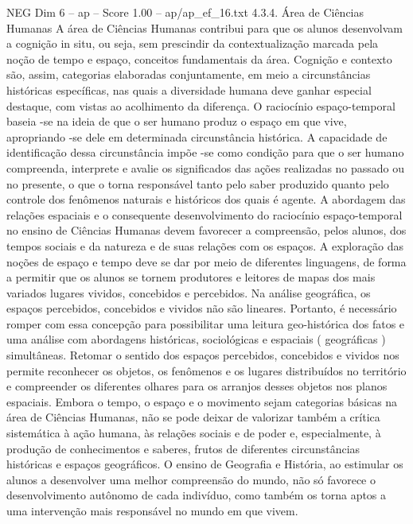 \begin{textsample}{NEG Dim 6 – ap – Score 1.00 – ap/ap\_ef\_16.txt}  \label{ex:f6_neg_185}
4.3.4.
Área de Ciências Humanas A área de Ciências Humanas contribui para que os alunos desenvolvam a cognição in situ, ou seja, sem prescindir da contextualização marcada pela noção de tempo e espaço, conceitos fundamentais da área.
Cognição e contexto são, assim, categorias elaboradas conjuntamente, em meio a circunstâncias históricas específicas, nas quais a diversidade humana deve ganhar especial destaque, com vistas ao acolhimento da diferença.
O raciocínio espaço-temporal baseia -se na ideia de que o ser humano produz o espaço em que vive, apropriando -se dele em determinada circunstância histórica.
A capacidade de identificação dessa circunstância impõe -se como condição para que o ser humano compreenda, interprete e avalie os significados das ações realizadas no passado ou no presente, o que o torna responsável tanto pelo saber produzido quanto pelo controle dos fenômenos naturais e históricos dos quais é agente.
A abordagem das relações espaciais e o consequente desenvolvimento do raciocínio espaço-temporal no ensino de Ciências Humanas devem favorecer a compreensão, pelos alunos, dos tempos sociais e da natureza e de suas relações com os espaços.
A exploração das noções de espaço e tempo deve se dar por meio de diferentes linguagens, de forma a permitir que os alunos se tornem produtores e leitores de mapas dos mais variados lugares vividos, concebidos e percebidos.
Na análise geográfica, os espaços percebidos, concebidos e vividos não são lineares.
Portanto, é necessário romper com essa concepção para possibilitar uma leitura geo-histórica dos fatos e uma análise com abordagens históricas, sociológicas e espaciais ( geográficas ) simultâneas.
Retomar o sentido dos espaços percebidos, concebidos e vividos nos permite reconhecer os objetos, os fenômenos e os lugares distribuídos no território e compreender os diferentes olhares para os arranjos desses objetos nos planos espaciais.
Embora o tempo, o espaço e o movimento sejam categorias básicas na área de Ciências Humanas, não se pode deixar de valorizar também a crítica sistemática à ação humana, às relações sociais e de poder e, especialmente, à produção de conhecimentos e saberes, frutos de diferentes circunstâncias históricas e espaços geográficos.
O ensino de Geografia e História, ao estimular os alunos a desenvolver uma melhor compreensão do mundo, não só favorece o desenvolvimento autônomo de cada indivíduo, como também os torna aptos a uma intervenção mais responsável no mundo em que vivem.

\end{textsample}
